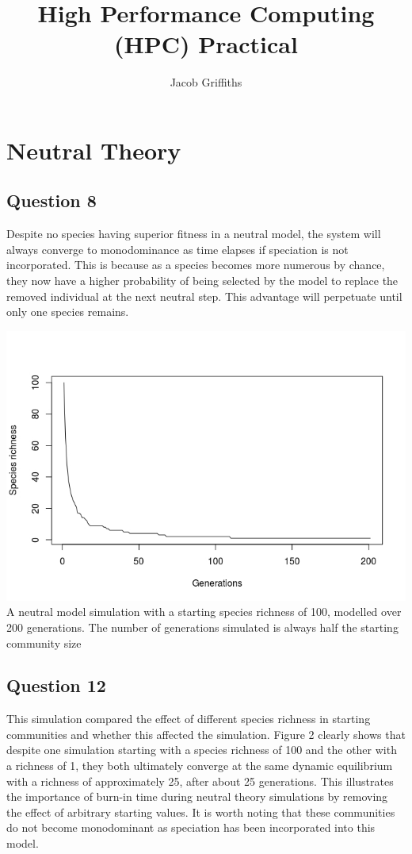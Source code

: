 \documentclass{article}
\begin{document}
\title{High Performance Computing (HPC) Practical{}}
\author{Jacob Griffiths}

\maketitle

\section*{Neutral Theory}

\bigskip

\subsection*{Question 8}
Despite no species having superior fitness in a neutral model, 
the system will always converge to monodominance
as time elapses if speciation is not incorporated. This is because as a species becomes more
numerous by chance, they now have a higher probability of 
being selected by the model to replace the removed individual at
the next neutral step. This advantage will perpetuate until only 
one species remains.

\begin{center}
    \includegraphics[width=\textwidth]{../Results/question_8.jpeg}
     {A neutral model simulation with a starting species
    richness of 100, modelled over 200 generations. The number of generations simulated
    is always half the starting community size}
\end{center}


\subsection*{Question 12}
This simulation compared the effect of different species richness
in starting communities and whether this affected the simulation.
Figure 2 clearly shows that despite one simulation starting with a 
species richness of 100 and the other with a richness of 1, they both 
ultimately converge at the same dynamic equilibrium with a richness
of approximately 25, after about 25 generations. This illustrates 
the importance of burn-in time during neutral theory simulations
by removing the effect of arbitrary starting values. It is worth noting
that these communities do not become monodominant as speciation has been 
incorporated into this model.
\end{document}
